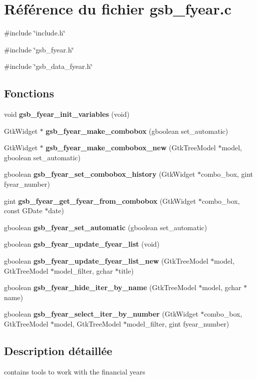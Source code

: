 \section{Référence du fichier gsb\_\-fyear.c}
\label{gsb__fyear_8c}
{\ttfamily \#include \char`\"{}include.h\char`\"{}}\par
{\ttfamily \#include \char`\"{}gsb\_\-fyear.h\char`\"{}}\par
{\ttfamily \#include \char`\"{}gsb\_\-data\_\-fyear.h\char`\"{}}\par
\subsection*{Fonctions}
\begin{DoxyCompactItemize}
\item 
void {\bf gsb\_\-fyear\_\-init\_\-variables} (void)
\item 
GtkWidget $\ast$ {\bf gsb\_\-fyear\_\-make\_\-combobox} (gboolean set\_\-automatic)
\item 
GtkWidget $\ast$ {\bf gsb\_\-fyear\_\-make\_\-combobox\_\-new} (GtkTreeModel $\ast$model, gboolean set\_\-automatic)
\item 
gboolean {\bf gsb\_\-fyear\_\-set\_\-combobox\_\-history} (GtkWidget $\ast$combo\_\-box, gint fyear\_\-number)
\item 
gint {\bf gsb\_\-fyear\_\-get\_\-fyear\_\-from\_\-combobox} (GtkWidget $\ast$combo\_\-box, const GDate $\ast$date)
\item 
gboolean {\bf gsb\_\-fyear\_\-set\_\-automatic} (gboolean set\_\-automatic)
\item 
gboolean {\bf gsb\_\-fyear\_\-update\_\-fyear\_\-list} (void)
\item 
gboolean {\bf gsb\_\-fyear\_\-update\_\-fyear\_\-list\_\-new} (GtkTreeModel $\ast$model, GtkTreeModel $\ast$model\_\-filter, gchar $\ast$title)
\item 
gboolean {\bf gsb\_\-fyear\_\-hide\_\-iter\_\-by\_\-name} (GtkTreeModel $\ast$model, gchar $\ast$name)
\item 
gboolean {\bf gsb\_\-fyear\_\-select\_\-iter\_\-by\_\-number} (GtkWidget $\ast$combo\_\-box, GtkTreeModel $\ast$model, GtkTreeModel $\ast$model\_\-filter, gint fyear\_\-number)
\end{DoxyCompactItemize}


\subsection{Description détaillée}
contains tools to work with the financial years 

